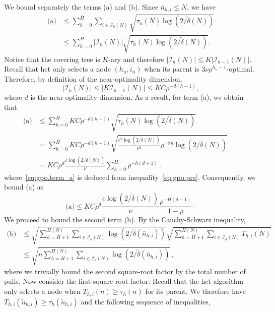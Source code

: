 We bound separately the terms (a) and (b). Since $\bar{n}_{h,i}\leq N$, we have
\begin{align*} %
    \text{(a)} &\leq \sum_{h=0}^{\bar{H}}\sum_{i\in\mathcal{I}_h(N)} \sqrt{\tau_h(N)\log(2/\tilde{\delta}(N))}\\
    &\leq \sum_{h=0}^{\bar{H}}|\mathcal{I}_h(N)| \sqrt{\tau_h(N)\log(2/\tilde{\delta}(N))}.
\end{align*}
Notice that the covering tree is $K$-ary and therefore $|\mathcal{I}_h(N)| \leq K|\mathcal{I}_{h-1}(N)|$. Recall that \gls{hct} only selects a node $(h_n,i_n)$ when its parent is $3\nu\rho^{h_n-1}$-optimal. Therefore, by definition of the near-optimality dimension,
\begin{equation*} %
|\mathcal{I}_h(N)| \leq| K\mathcal{I}_{h-1}(N)| \leq KC\rho^{-d(h-1)},
\end{equation*}
where $d$ is the near-optimality dimension. As a result, for term (a), we obtain that
\begingroup
\allowdisplaybreaks
\begin{align}
    \text{(a)} & \leq \sum_{h=0}^{\bar{H}} KC\rho^{-d(h-1)} \sqrt{\tau_h(N)\log(2/\tilde{\delta}(N))} \nonumber \\
               & = \sum_{h=0}^{\bar{H}} KC\rho^{-d(h-1)} \sqrt{\frac{c^2\log(2/\tilde{\delta}(N))}{\nu^2}\rho^{-2h}\log(2/\tilde{\delta}(N))} && \label{eq:gpo.term_a} \\
               & = KC\rho^d \frac{c\log(2/\tilde{\delta}(N))}{\nu} \sum_{h=0}^{\bar{H}} \rho^{-h(d+1)} \nonumber \,.
\end{align}
\endgroup
where~\eqref{eq:gpo.term_a} is deduced from inequality~\eqref{eq:gpo.pre}. Consequently, we bound (a) as
\begin{equation} \label{eq17}
    \text{(a)} \leq KC\rho^d \frac{c\log\left(2/\tilde{\delta}(N)\right)}{\nu} \frac{\rho^{-\bar{H}(d+1)}}{1-\rho}\cdot
\end{equation}
We proceed to bound the second term (b). By the Cauchy-Schwarz inequality,
\begin{align*} %
    \text{(b)} &\leq \sqrt{\sum_{h=\bar{H}+1}^{H(N)}\sum_{i\in\mathcal{I}_h(N)} \log\left(2/\tilde{\delta}\left(\bar{n}_{h,i}\right)\right)} \sqrt{\sum_{h=\bar{H}+1}^{H(N)}\sum_{i\in\mathcal{I}_h(N)} T_{h,i}(N)}\\
    &\leq \sqrt{n\sum_{h=\bar{H}+1}^{H(N)}\sum_{i\in\mathcal{I}_h(N)} \log\left(2/\tilde{\delta}\left(\bar{n}_{h,i}\right)\right)}\,,
\end{align*}
where we trivially bound the second square-root factor by the total number of pulls. Now consider the first square-root factor. Recall that the \gls{hct} algorithm only selects a node when $T_{h,i}(n)\geq\tau_h(n)$ for its parent. We therefore have $T_{h,i}(\tilde{n}_{h,i})\geq\tau_h(\tilde{n}_{h,i})$ and the following sequence of inequalities,
